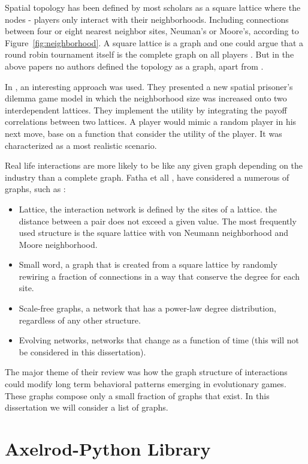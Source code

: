 Spatial topology has been defined by most scholars as a square lattice where
the nodes - players only interact with their neighborhoods. Including connections
between four or eight nearest neighbor sites, Neuman's or Moore's, according to
Figure~\ref{fig:neighborhood}. A square lattice is a graph and one could argue
that a round robin tournament itself is the complete graph on all players
\cite{Bela}. But in the above papers
no authors defined the topology as a graph, apart from \cite{Meng2015}.

In \cite{Meng2015}, an interesting approach was used. They presented a new
spatial prisoner's dilemma game model in which the neighborhood size was
increased onto two interdependent lattices. They implement the utility by
integrating the payoff correlations between two lattices. A player would mimic a
random player in his next move, base on a function that consider the utility of
the player. It was characterized as a most realistic scenario.

Real life interactions are more likely to be like any given graph depending on
the industry than a complete graph. Fatha et all \cite{Szabo2007}, have
considered a numerous of graphs, such as :

\begin{itemize}
  \item Lattice, the interaction network is defined by the sites of a lattice.
   the distance between a pair does not exceed a given value.
   The most frequently used structure is the square lattice with von Neumann
   neighborhood and Moore neighborhood.
  \item Small word, a graph that is created from a square lattice by randomly
   rewiring a fraction of connections in a way that conserve the degree for
   each site.
  \item Scale-free graphs, a network that has a power-law degree distribution, regardless of
   any other structure.
  \item Evolving networks, networks that change as a function of time (this will
      not be considered in this dissertation).
\end{itemize}

The major theme of their review was how the graph structure of interactions could
modify long term behavioral patterns emerging in evolutionary games.
These graphs compose only a small fraction of graphs that exist. In this
dissertation we will consider a list of graphs.

\section{Axelrod-Python Library}

